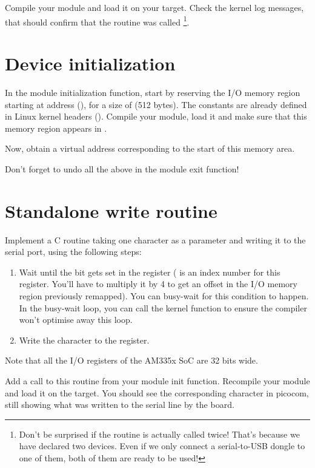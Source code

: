 Compile your module and load it on your target. Check the kernel log
messages, that should confirm that the  routine was
called \footnote{Don't be surprised if the  routine is
actually called twice! That's because we have declared two devices.
Even if we only connect a serial-to-USB dongle to one of them, both
of them are ready to be used!}.

\section{Device initialization}

In the module initialization function, start by reserving the I/O
memory region starting at address (), for a size of
 (512 bytes). The  constants are already
defined in Linux kernel headers ().  
Compile your module, load it and make sure that this memory region
appears in .

Now, obtain a virtual address corresponding to the start of this
memory area.

Don't forget to undo all the above in the module exit function!

\section{Standalone write routine}

Implement a C routine taking one character as a parameter and writing
it to the serial port, using the following steps:

\begin{enumerate}
\item Wait until the  bit gets set in the
   register ( is an index number for
  this register. You'll have to multiply it by 4 to get an offset in
  the I/O memory region previously remapped). You can busy-wait for
  this condition to happen. In the busy-wait loop, you can call the
   kernel function to ensure the compiler won't
  optimise away this loop.

\item Write the character to the  register.

\end{enumerate}

Note that all the I/O registers of the AM335x SoC are 32 bits wide.

Add a call to this routine from your module init function. Recompile
your module and load it on the target. You should see the
corresponding character in picocom, still showing what was written to
the serial line by the board.

